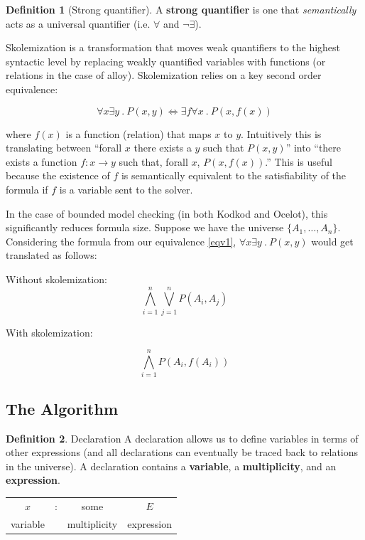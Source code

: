 \documentclass[10pt]{article}
\theoremstyle{definition}
\newtheorem{definition}{Definition}[section]
\begin{document}
  \begin{definition}[Strong quantifier]
      A \textbf{strong quantifier} is one that \emph{semantically} acts as a universal quantifier (i.e. $\forall$ and $\neg \exists$).
  \end{definition}

  Skolemization is a transformation that moves weak quantifiers to the highest syntactic level by replacing weakly quantified variables with functions (or relations in the case of alloy). Skolemization relies on a key second order equivalence:

  \begin{equation} \label{eqv1}
      \forall x \exists y~.~P(x, y) \Leftrightarrow \exists f \forall x~.~P(x, f(x))
  \end{equation}

  where $f(x)$ is a function (relation) that maps $x$ to $y$. Intuitively this is translating between ``forall $x$ there exists a $y$ such that $P(x, y)$'' into ``there exists a function $f : x \rightarrow y$ such that, forall $x$, $P(x, f(x))$.'' This is useful because the existence of $f$ is semantically equivalent to the satisfiability of the formula if $f$ is a variable sent to the solver.

  In the case of bounded model checking (in both Kodkod and Ocelot), this significantly reduces formula size. Suppose we have the universe $\{A_1, \dots, A_n\}$. Considering the formula from our equivalence \ref{eqv1}, $\forall x \exists y~.~P(x,y)$ would get translated as follows:

  Without skolemization:
  \begin{equation} \label{woskolem}
      \bigwedge_{i=1}^n\bigvee_{j=1}^n P(A_i, A_j)
  \end{equation}

  With skolemization:

  \begin{equation} \label{wskolem}
      \bigwedge_{i=1}^nP(A_i, f(A_i))
  \end{equation}

  \subsection{The Algorithm}

  \theoremstyle{definition}
  \begin{definition}{Declaration}
      A declaration allows us to define variables in terms of other expressions (and all declarations can eventually be traced back to relations in the universe). A declaration contains a \textbf{variable}, a \textbf{multiplicity}, and an \textbf{expression}.

      \begin{center}
          \begin{tabular}{c c c c}
              $x$ & : & some & $E$ \\
              variable & & multiplicity & expression
          \end{tabular}
      \end{center}
  \end{definition}
\end{document}
